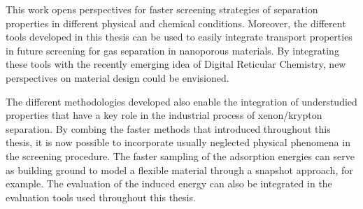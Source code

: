 This work opens perspectives for faster screening strategies of separation properties in different physical and chemical conditions. Moreover, the different tools developed in this thesis can be used to easily integrate transport properties in future screening for gas separation in nanoporous materials. By integrating these tools with the recently emerging idea of Digital Reticular Chemistry,\autocite{Lyu_2020} new perspectives on material design could be envisioned. 

The different methodologies developed also enable the integration of understudied properties that have a key role in the industrial process of xenon/krypton separation. By combing the faster methods that introduced throughout this thesis, it is now possible to incorporate usually neglected physical phenomena in the screening procedure. The faster sampling of the adsorption energies can serve as building ground to model a flexible material through a snapshot approach, for example\autocite{Witman_2017}. The evaluation of the induced energy\autocite{Lachet_1998} can also be integrated in the evaluation tools used throughout this thesis. 



\vfill
\begin{center}
\end{center}
\vfill\vfill

